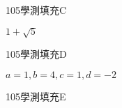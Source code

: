 \begin{QUESTIONS}
\begin{QUESTION}
\begin{ExamInfo}{105}{學測}{填充}{C}
        \end{ExamInfo}
        \begin{ExamAnsRateInfo}{43}{85}{40}{4}
        \end{ExamAnsRateInfo}
        \begin{QBODY}
        \end{QBODY}
        \begin{QFROMS}
        \end{QFROMS}
        \begin{QTAGS}\end{QTAGS}
        \begin{QANS}
            $1+\sqrt{5}$
        \end{QANS}
        \begin{QSOLLIST}
        \end{QSOLLIST}
        \begin{QEMPTYSPACE}
        \end{QEMPTYSPACE}
    \end{QUESTION}
    \begin{QUESTION}
        \begin{ExamInfo}{105}{學測}{填充}{D}
        \end{ExamInfo}
        \begin{ExamAnsRateInfo}{51}{86}{56}{11}
        \end{ExamAnsRateInfo}
        \begin{QBODY}
        \end{QBODY}
        \begin{QFROMS}
        \end{QFROMS}
        \begin{QTAGS}\end{QTAGS}
        \begin{QANS}
            $a=1, b=4, c= 1, d=-2$
        \end{QANS}
        \begin{QSOLLIST}
        \end{QSOLLIST}
        \begin{QEMPTYSPACE}
        \end{QEMPTYSPACE}
    \end{QUESTION}
    \begin{QUESTION}
        \begin{ExamInfo}{105}{學測}{填充}{E}
        \end{ExamInfo}
        \begin{ExamAnsRateInfo}{31}{60}{23}{10}
        \end{ExamAnsRateInfo}

\end{QUESTION}
\end{QUESTIONS}
